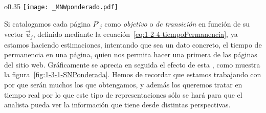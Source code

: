 



\begin{wrapfigure}{o}{0.35\textwidth}
  \centering
  \texttt{[image: \_MNWponderado.pdf]}
	\caption{\Sn ponderada}
	\label{fig:1-3-1-SNPonderada}
\end{wrapfigure}
Si catalogamos cada página $P'_j$ como \emph{objetivo} o \emph{de transición} en función de su vector $\overrightarrow{u}_j$, definido mediante la ecuación~\ref{eq:1-2-4-tiempoPermanencia}, ya estamos haciendo estimaciones, intentando que sea un dato concreto, el tiempo de permanencia en una página, quien nos permita hacer una primera \clasificacion de las páginas del sitio web. Gráficamente se aprecia en seguida el efecto de esta \clasificacion, como muestra la figura~\ref{fig:1-3-1-SNPonderada}. Hemos de recordar que estamos trabajando con \DM por que serán muchos los \grafos que obtengamos, y además los queremos tratar en tiempo real por lo que este tipo de representaciones sólo se hará para que el analista pueda ver la información que tiene desde distintas perspectivas.


